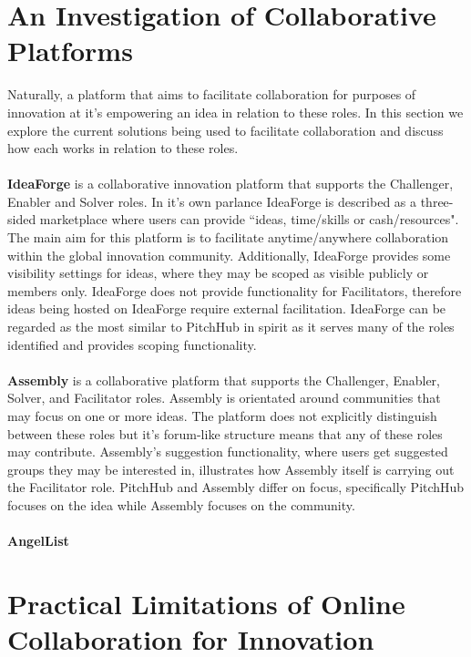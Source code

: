 \section{An Investigation of Collaborative Platforms}
Naturally, a platform that aims to facilitate collaboration for purposes of innovation at it's empowering an idea in relation to these roles. In this section we explore the current solutions being used to facilitate collaboration and discuss how each works in relation to these roles.
\\
\\
\textbf{IdeaForge}\cite{ideaForge:online}
is a collaborative innovation platform that supports the Challenger, Enabler and Solver roles. In it's own parlance IdeaForge is described as a three-sided marketplace where users can provide ``ideas, time/skills or cash/resources". The main aim for this platform is to facilitate anytime/anywhere collaboration within the global innovation community. Additionally, IdeaForge provides some visibility settings for ideas, where they may be scoped as visible publicly or members only. IdeaForge does not provide functionality for Facilitators, therefore ideas being hosted on IdeaForge require external facilitation. IdeaForge can be regarded as the most similar to PitchHub in spirit as it serves many of the roles identified and provides scoping functionality.
\\
\\
\textbf{Assembly}\cite{assembly:online}
is a collaborative platform that supports the Challenger, Enabler, Solver, and Facilitator roles. Assembly is orientated around communities that may focus on one or more ideas. The platform does not explicitly distinguish between these roles but it's forum-like structure means that any of these roles may contribute. Assembly's suggestion functionality, where users get suggested groups they may be interested in, illustrates how Assembly itself is carrying out the Facilitator role. PitchHub and Assembly differ on focus, specifically PitchHub focuses on the idea while Assembly focuses on the community. 
\\
\\
\textbf{AngelList}\cite{Angel:online}



\section{Practical Limitations of Online Collaboration for Innovation}